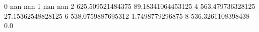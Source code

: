 0 nan nan
1 nan nan
2 625.509521484375 89.18341064453125
4 563.479736328125 27.15362548828125
6 538.0759887695312 1.7498779296875
8 536.3261108398438 0.0
